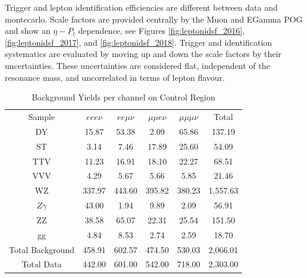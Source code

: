 Trigger and lepton identification efficiencies are different between data
and montecarlo. Scale factors are provided centrally by the Muon and EGamma POG
and show an $\eta-P_{t}$ dependence, see Figures \ref{fig:leptonidsf_2016},
\ref{fig:leptonidsf_2017}, and \ref{fig:leptonidsf_2018}. Trigger and
identification systematics are evaluated by moving up and down the scale factors
by their uncertainties. These uncertainties are considered flat, independent
of the resonance mass, and uncorrelated in terms of lepton flavour.

\begin{table}
  \caption{Background Yields per
    channel on Control Region}
 \begin{center}
 \begin{tabular}{cccccc}\hline\hline
Sample & $eee\nu$ & $ee\mu\nu$ & $\mu\mu e\nu$ & $\mu\mu\mu\nu$ & Total \\
DY & 15.87 & 53.38 & 2.09 & 65.86 & 137.19 \\
ST & 3.14 & 7.46 & 17.89 & 25.60 & 54.09 \\
TTV & 11.23 & 16.91 & 18.10 & 22.27 & 68.51 \\
VVV & 4.29 & 5.67 & 5.66 & 5.85 & 21.46 \\
WZ & 337.97 & 443.60 & 395.82 & 380.23 & 1,557.63 \\
$Z\gamma$ & 43.00 & 1.94 & 9.89 & 2.09 & 56.91 \\
ZZ & 38.58 & 65.07 & 22.31 & 25.54 & 151.50 \\
gg & 4.84 & 8.53 & 2.74 & 2.59 & 18.70 \\ \hline
Total Background & 458.91 & 602.57 & 474.50 & 530.03 & 2,066.01 \\ \hline
Total Data & 442.00 & 601.00 & 542.00 & 718.00 & 2,303.00 \\ \hline
 \end{tabular}
 \end{center}
 \label{tab:BackgroundYieldsCR}
\end{table}

